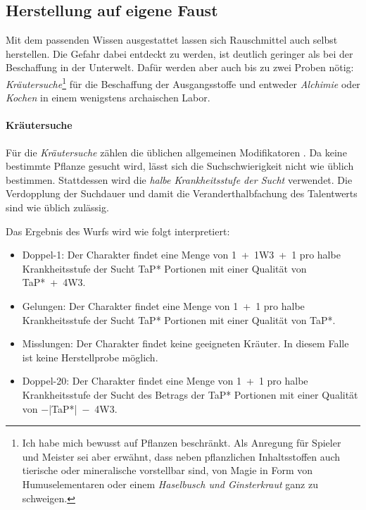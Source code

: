 \subsection{Herstellung auf eigene Faust\label{beschaffung-herstellung}}
Mit dem passenden Wissen ausgestattet lassen sich Rauschmittel auch selbst herstellen. Die Gefahr dabei entdeckt zu werden, ist deutlich geringer als bei der Beschaffung in der Unterwelt. Dafür werden aber auch bis zu zwei Proben nötig: \emph{Kräutersuche}\footnote{Ich habe mich bewusst auf Pflanzen beschränkt. Als Anregung für Spieler und Meister sei aber erwähnt, dass neben pflanzlichen Inhaltsstoffen auch tierische oder mineralische vorstellbar sind, von Magie in Form von Humuselementaren oder einem \emph{Haselbusch und Ginsterkraut} ganz zu schweigen.} für die Beschaffung der Ausgangsstoffe und entweder \emph{Alchimie} oder \emph{Kochen} in einem wenigstens archaischen Labor.

\paragraph{Kräutersuche}
Für die \emph{Kräutersuche} zählen die üblichen allgemeinen Modifikatoren \cite[S.~223/224]{ZBA}\cite[S.~113]{WdE}. Da keine bestimmte Pflanze gesucht wird, lässt sich die Suchschwierigkeit nicht wie üblich bestimmen. Stattdessen wird die \emph{halbe Krankheitsstufe der Sucht} verwendet. Die Verdopplung der Suchdauer und damit die Veranderthalbfachung des Talentwerts sind wie üblich zulässig.

Das Ergebnis des Wurfs wird wie folgt interpretiert:
\begin{itemize}
	\item Doppel-1: Der Charakter findet eine Menge von 1~+~1W3~+~1 pro halbe Krankheitsstufe der Sucht TaP* Portionen mit einer Qualität von TaP*~+~4W3.
	\item Gelungen: Der Charakter findet eine Menge von 1~+~1 pro halbe Krankheitsstufe der Sucht TaP* Portionen mit einer Qualität von TaP*.
	\item Misslungen: Der Charakter findet keine geeigneten Kräuter. In diesem Falle ist keine Herstellprobe möglich.
	\item Doppel-20: Der Charakter findet eine Menge von 1~+~1 pro halbe Krankheitsstufe der Sucht des Betrags der TaP* Portionen mit einer Qualität von −|TaP*|~−~4W3.
\end{itemize}

